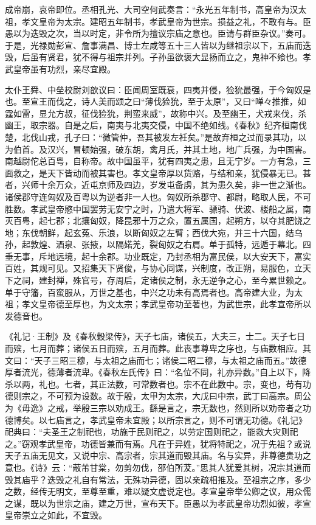 \documentclass[12pt,UTF8]{ctexbook}
\begin{document}
成帝崩，哀帝即位。丞相孔光、大司空何武奏言：“永光五年制书，高皇帝为汉太祖，孝文皇帝为太宗。建昭五年制书，孝武皇帝为世宗。损益之礼，不敢有与。臣愚以为迭毁之次，当以时定，非令所为擅议宗庙之意也。臣请与群臣杂议。”奏可。于是，光禄勋彭宣、詹事满昌、博士左咸等五十三人皆以为继祖宗以下，五庙而迭毁，后虽有贤君，犹不得与祖宗并列。子孙虽欲褒大显扬而立之，鬼神不飨也。孝武皇帝虽有功烈，亲尽宜殿。



太仆王舜、中垒校尉刘歆议曰：臣闻周室既衰，四夷并侵，猃狁最强，于今匈奴是也。至宣王而伐之，诗人美而颂之曰“薄伐猃狁，至于太原”，又曰“啴々推推，如霆如雷，显允方叔，征伐猃狁，荆蛮来威”，故称中兴。及至幽王，犬戎来伐，杀幽王，取宗器。自是之后，南夷与北夷交侵，中国不绝如线。《春秋》纪齐桓南伐楚，北伐山戎，孔子曰：“微管仲，吾其被发左衽矣。”是故弃桓之过而录其功，以为伯首。及汉兴，冒顿始强，破东胡，禽月氏，并其土地，地广兵强，为中国害。南越尉佗总百粤，自称帝。故中国虽平，犹有四夷之患，且无宁岁。一方有急，三面救之，是天下皆动而被其害也。孝文皇帝厚以货赂，与结和亲，犹侵暴无已。甚者，兴师十余万众，近屯京师及四边，岁发屯备虏，其为患久矣，非一世之渐也。诸侯郡守连匈奴及百粤以为逆者非一人也。匈奴所杀郡守、都尉，略取人民，不可胜数。孝武皇帝愍中国罢劳无安宁之时，乃遣大将军、骠骑、伏波、楼船之属，南灭百粤，起七郡；北攘匈奴，降昆邪十万之众，置五属国，起朔方，以夺其肥饶之地；东伐朝鲜，起玄菟、乐浪，以断匈奴之左臂；西伐大宛，并三十六国，结乌孙，起敦煌、酒泉、张掖，以隔婼羌，裂匈奴之右肩。单于孤特，远遁于幕北。四垂无事，斥地远境，起十余郡。功业既定，乃封丞相为富民侯，以大安天下，富实百姓，其规可见。又招集天下贤俊，与协心同谋，兴制度，改正朔，易服色，立天下之祠，建封禅，殊官号，存周后，定诸侯之制，永无逆争之心，至今累世赖之。单于守籓，百蛮服从，万世之基也，中兴之功未有高焉者也。高帝建大业，为太祖；孝文皇帝德至厚也，为文太宗；孝武皇帝功至著也，为武世宗，此孝宣帝所以发德音也。



《礼记·王制》及《春秋穀梁传》，天子七庙，诸侯五，大夫三，士二。天子七日而殡，七月而葬；诸侯五日而殡，五月而葬。此丧事尊卑之序也，与庙数相应。其文曰：“天子三昭三穆，与太祖之庙而七；诸侯二昭二穆，与太祖之庙而五。”故德厚者流光，德薄者流卑。《春秋左氏传》曰：“名位不同，礼亦异数。”自上以下，降杀以两，礼也。七者，其正法数，可常数者也。宗不在此数中。宗，变也，苟有功德则宗之，不可预为设数。故于殷，太甲为太宗，大戊曰中宗，武丁曰高宗。周公为《毋逸》之戒，举殷三宗以劝成王。繇是言之，宗无数也，然则所以劝帝者之功德博矣。以七庙言之，孝武皇帝未宜殿；以所宗言之，则不可谓无功德。《礼记》祀典曰：“夫圣王之制祀也，功施于民则祀之，以劳定国则祀之，能救大灾则祀之。”窃观孝武皇帝，功德皆兼而有焉。凡在于异姓，犹将特祀之，况于先祖？或说天子五庙无见文，又说中宗、高宗者，宗其道而毁其庙。名与实异，非尊德贵功之意也。《诗》云：“蔽芾甘棠，勿剪勿伐，邵伯所茇。”思其人犹爱其树，况宗其道而毁其庙乎？迭毁之礼自有常法，无殊功异德，固以亲疏相推及。至祖宗之序，多少之数，经传无明文，至尊至重，难以疑文虚说定也。孝宣皇帝举公卿之议，用众儒之谋，既以为世宗之庙，建之万世，宣布天下。臣愚以为孝武皇帝功烈如彼，孝宣皇帝崇立之如此，不宜毁。
\end{document}
